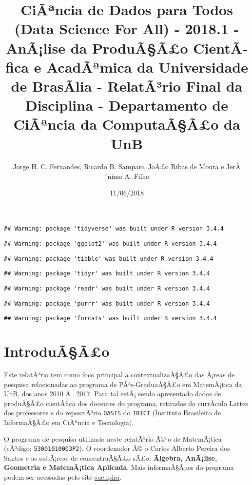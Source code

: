 \documentclass[]{article}
\title{CiÃªncia de Dados para Todos (Data Science For All) - 2018.1 - AnÃ¡lise
da ProduÃ§Ã£o CientÃ­fica e AcadÃªmica da Universidade de BrasÃ­lia -
RelatÃ³rio Final da Disciplina - Departamento de CiÃªncia da
ComputaÃ§Ã£o da UnB}
\author{Jorge H. C. Fernandes, Ricardo B. Sampaio, JoÃ£o Ribas de Moura e
JerÃ´nimo A. Filho}
\date{11/06/2018}
\begin{document}
\maketitle

\begin{verbatim}
## Warning: package 'tidyverse' was built under R version 3.4.4
\end{verbatim}

\begin{verbatim}
## Warning: package 'ggplot2' was built under R version 3.4.4
\end{verbatim}

\begin{verbatim}
## Warning: package 'tibble' was built under R version 3.4.4
\end{verbatim}

\begin{verbatim}
## Warning: package 'tidyr' was built under R version 3.4.4
\end{verbatim}

\begin{verbatim}
## Warning: package 'readr' was built under R version 3.4.4
\end{verbatim}

\begin{verbatim}
## Warning: package 'purrr' was built under R version 3.4.4
\end{verbatim}

\begin{verbatim}
## Warning: package 'forcats' was built under R version 3.4.4
\end{verbatim}

\section{IntroduÃ§Ã£o}\label{introduaao}

Este relatÃ³rio tem como foco principal a contextualizaÃ§Ã£o das Ã¡reas
de pesquisa relacionadas ao programa de PÃ³s-GraduaÃ§Ã£o em MatemÃ¡tica
da UnB, dos anos 2010 Ã~ 2017. Para tal estÃ¡ sendo apresentado dados de
produÃ§Ã£o cientÃ­fica dos docentes do programa, retirados do currÃ­culo
Lattes dos professores e do repositÃ³rio \texttt{OASIS} do
\texttt{IBICT} (Instituto Brasileiro de InformaÃ§Ã£o em CiÃªncia e
Tecnologia).

O programa de pesquisa utilizado neste relatÃ³rio Ã© o de MatemÃ¡tica
(cÃ³digo: \texttt{53001010003P2}). O coordenador Ã© o Carlos Alberto
Pereira dos Santos e as subÃ¡reas de concentraÃ§Ã£o sÃ£o:
\textbf{Ãlgebra, AnÃ¡lise, Geometria e MatemÃ¡tica Aplicada}. Mais
informaÃ§Ãµes do programa podem ser acessadas pelo site
\href{https://sucupira.capes.gov.br/sucupira/public/consultas/coleta/programa/viewPrograma.jsf?popup=true\&cd_programa=53001010003P2}{sucupira}.
\end{document}
